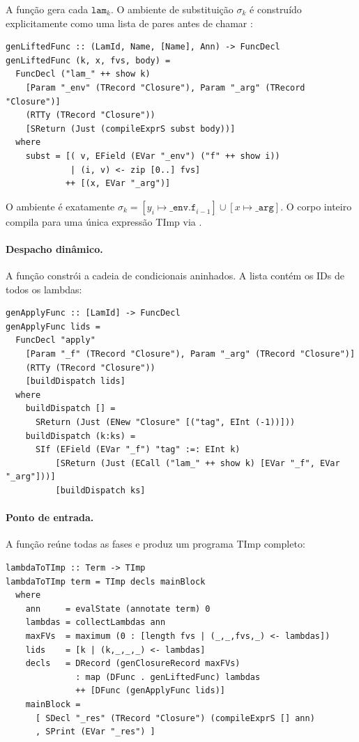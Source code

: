 A função  gera cada \(\mathtt{lam}_k\). O
ambiente de substituição \(\sigma_k\) é construído explicitamente
como uma lista de pares antes de chamar :

\begin{verbatim}
genLiftedFunc :: (LamId, Name, [Name], Ann) -> FuncDecl
genLiftedFunc (k, x, fvs, body) =
  FuncDecl ("lam_" ++ show k)
    [Param "_env" (TRecord "Closure"), Param "_arg" (TRecord "Closure")]
    (RTTy (TRecord "Closure"))
    [SReturn (Just (compileExprS subst body))]
  where
    subst = [( v, EField (EVar "_env") ("f" ++ show i))
             | (i, v) <- zip [0..] fvs]
            ++ [(x, EVar "_arg")]
\end{verbatim}

O ambiente  é exatamente \(\sigma_k = [y_i \mapsto
\mathtt{\_env.f}_{i-1}] \cup [x \mapsto \mathtt{\_arg}]\). O corpo
inteiro compila para uma única expressão TImp via
.

\paragraph{Despacho dinâmico.}

A função  constrói a cadeia de condicionais
aninhados. A lista  contém os IDs de todos os lambdas:

\begin{verbatim}
genApplyFunc :: [LamId] -> FuncDecl
genApplyFunc lids =
  FuncDecl "apply"
    [Param "_f" (TRecord "Closure"), Param "_arg" (TRecord "Closure")]
    (RTTy (TRecord "Closure"))
    [buildDispatch lids]
  where
    buildDispatch [] =
      SReturn (Just (ENew "Closure" [("tag", EInt (-1))]))
    buildDispatch (k:ks) =
      SIf (EField (EVar "_f") "tag" :=: EInt k)
          [SReturn (Just (ECall ("lam_" ++ show k) [EVar "_f", EVar "_arg"]))]
          [buildDispatch ks]
\end{verbatim}

\paragraph{Ponto de entrada.}

A função  reúne todas as fases e produz um
programa TImp completo:

\begin{verbatim}
lambdaToTImp :: Term -> TImp
lambdaToTImp term = TImp decls mainBlock
  where
    ann     = evalState (annotate term) 0
    lambdas = collectLambdas ann
    maxFVs  = maximum (0 : [length fvs | (_,_,fvs,_) <- lambdas])
    lids    = [k | (k,_,_,_) <- lambdas]
    decls   = DRecord (genClosureRecord maxFVs)
              : map (DFunc . genLiftedFunc) lambdas
              ++ [DFunc (genApplyFunc lids)]
    mainBlock =
      [ SDecl "_res" (TRecord "Closure") (compileExprS [] ann)
      , SPrint (EVar "_res") ]
\end{verbatim}

